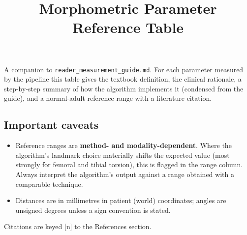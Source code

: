 \documentclass[10pt]{article}
\title{Morphometric Parameter Reference Table}
\date{}
\begin{document}
\maketitle

A companion to \texttt{reader\_measurement\_guide.md}. For each parameter measured by
the pipeline this table gives the textbook definition, the clinical rationale, a
step-by-step summary of how the algorithm implements it (condensed from the guide),
and a normal-adult reference range with a literature citation.

\subsection*{Important caveats}
\begin{itemize}[leftmargin=1.4em,itemsep=2pt,topsep=2pt]
  \item Reference ranges are \textbf{method- and modality-dependent}. Where the
        algorithm's landmark choice materially shifts the expected value (most
        strongly for femoral and tibial torsion), this is flagged in the range
        column. Always interpret the algorithm's output against a range obtained
        with a comparable technique.
  \item Distances are in millimetres in patient (world) coordinates; angles are
        unsigned degrees unless a sign convention is stated.
\end{itemize}

Citations are keyed [n] to the References section.
\end{document}
